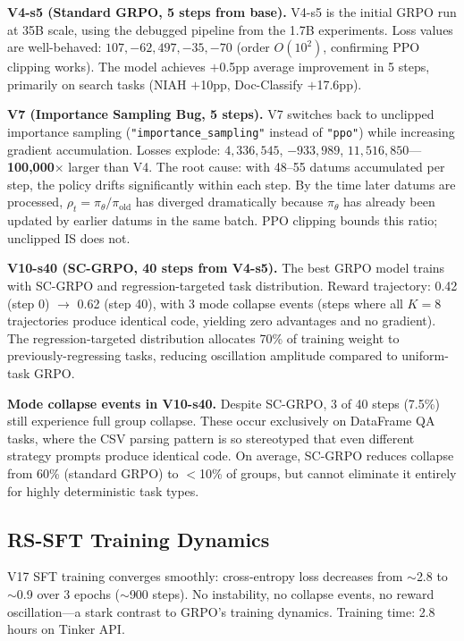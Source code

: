 \documentclass{article}
\begin{document}
\textbf{V4-s5 (Standard GRPO, 5 steps from base).} V4-s5 is the initial GRPO run at 35B scale, using the debugged pipeline from the 1.7B experiments. Loss values are well-behaved: $107, -62, 497, -35, -70$ (order $O(10^2)$, confirming PPO clipping works). The model achieves $+$0.5pp average improvement in 5 steps, primarily on search tasks (NIAH $+$10pp, Doc-Classify $+$17.6pp).

\textbf{V7 (Importance Sampling Bug, 5 steps).} V7 switches back to unclipped importance sampling (\texttt{"importance\_sampling"} instead of \texttt{"ppo"}) while increasing gradient accumulation. Losses explode: $4{,}336{,}545$, $-933{,}989$, $11{,}516{,}850$---\textbf{100,000$\times$} larger than V4. The root cause: with 48--55 datums accumulated per step, the policy drifts significantly within each step. By the time later datums are processed, $\rho_t = \pi_\theta / \pi_{\text{old}}$ has diverged dramatically because $\pi_\theta$ has already been updated by earlier datums in the same batch. PPO clipping bounds this ratio; unclipped IS does not.

\textbf{V10-s40 (SC-GRPO, 40 steps from V4-s5).} The best GRPO model trains with SC-GRPO and regression-targeted task distribution. Reward trajectory: 0.42 (step 0) $\to$ 0.62 (step 40), with 3 mode collapse events (steps where all $K{=}8$ trajectories produce identical code, yielding zero advantages and no gradient). The regression-targeted distribution allocates 70\% of training weight to previously-regressing tasks, reducing oscillation amplitude compared to uniform-task GRPO.

\textbf{Mode collapse events in V10-s40.} Despite SC-GRPO, 3 of 40 steps (7.5\%) still experience full group collapse. These occur exclusively on DataFrame QA tasks, where the CSV parsing pattern is so stereotyped that even different strategy prompts produce identical code. On average, SC-GRPO reduces collapse from 60\% (standard GRPO) to $<$10\% of groups, but cannot eliminate it entirely for highly deterministic task types.

\subsection{RS-SFT Training Dynamics}

V17 SFT training converges smoothly: cross-entropy loss decreases from $\sim$2.8 to $\sim$0.9 over 3 epochs ($\sim$900 steps). No instability, no collapse events, no reward oscillation---a stark contrast to GRPO's training dynamics. Training time: 2.8 hours on Tinker API.
\end{document}
